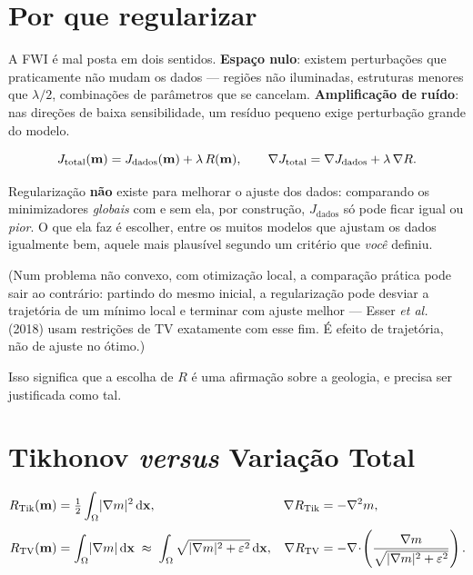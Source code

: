 \documentclass[11pt,a4paper,oneside]{report}
\begin{document}
\section{Por que regularizar}

A FWI \'e mal posta em dois sentidos. \textbf{Espa\c{c}o nulo}: existem
perturba\c{c}\~oes que praticamente n\~ao mudam os dados --- regi\~oes n\~ao
iluminadas, estruturas menores que $\lambda/2$, combina\c{c}\~oes de
par\^ametros que se cancelam. \textbf{Amplifica\c{c}\~ao de ru\'ido}: nas
dire\c{c}\~oes de baixa sensibilidade, um res\'iduo pequeno exige
perturba\c{c}\~ao grande do modelo.

\begin{equation}
J_{\text{total}}(\mathbf{m}) = J_{\text{dados}}(\mathbf{m}) + \lambda\,R(\mathbf{m}),
\qquad
\nabla J_{\text{total}} = \nabla J_{\text{dados}} + \lambda\,\nabla R .
\end{equation}

\begin{atencao}
Regulariza\c{c}\~ao \textbf{n\~ao} existe para melhorar o ajuste dos dados:
comparando os minimizadores \emph{globais} com e sem ela, por
constru\c{c}\~ao, $J_{\text{dados}}$ s\'o pode ficar igual ou \emph{pior}. O
que ela faz \'e escolher, entre os muitos modelos que ajustam os dados
igualmente bem, aquele mais plaus\'ivel segundo um crit\'erio que \emph{voc\^e}
definiu.

(Num problema n\~ao convexo, com otimiza\c{c}\~ao local, a compara\c{c}\~ao
pr\'atica pode sair ao contr\'ario: partindo do mesmo inicial, a
regulariza\c{c}\~ao pode desviar a trajet\'oria de um m\'inimo local e terminar
com ajuste melhor --- Esser \emph{et al.} (2018) usam restri\c{c}\~oes de TV
exatamente com esse fim. \'E efeito de trajet\'oria, n\~ao de ajuste no
\'otimo.)

Isso significa que a escolha de $R$ \'e uma afirma\c{c}\~ao sobre a geologia,
e precisa ser justificada como tal.
\end{atencao}

\section{Tikhonov \emph{versus} Varia\c{c}\~ao Total}

\begin{align}
R_{\text{Tik}}(\mathbf{m}) &= \tfrac{1}{2}\int_{\Omega} \lvert \nabla m \rvert^{2}\,\mathrm{d}\mathbf{x},
  &\nabla R_{\text{Tik}} &= -\nabla^{2} m ,
  \label{eq:tik}\\[3pt]
R_{\text{TV}}(\mathbf{m}) &= \int_{\Omega} \lvert \nabla m \rvert\,\mathrm{d}\mathbf{x}
  \;\approx\; \int_{\Omega}\sqrt{\lvert \nabla m \rvert^{2}+\varepsilon^{2}}\,\mathrm{d}\mathbf{x},
  &\nabla R_{\text{TV}} &= -\nabla\!\cdot\!\left(
    \frac{\nabla m}{\sqrt{\lvert \nabla m \rvert^{2}+\varepsilon^{2}}}\right).
  \label{eq:tv}
\end{align}
\end{document}
